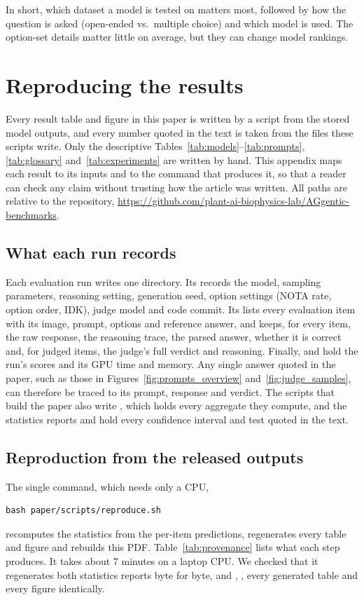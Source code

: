 \documentclass[10pt,letterpaper]{article}
\newcommand{\repo}{\url{https://github.com/plant-ai-biophysics-lab/AGgentic-benchmarks}}
\begin{document}
In short, which dataset a model is tested on matters most, followed by how the question is asked (open-ended vs.\ multiple choice) and which model is used. The option-set details matter little on average, but they can change model rankings.

\section{Reproducing the results}
\label{app:repro}
\setcounter{table}{0}
\renewcommand{\thetable}{D\arabic{table}}
\setcounter{figure}{0}
\renewcommand{\thefigure}{D\arabic{figure}}
Every result table and figure in this paper is written by a script from the stored model outputs, and every number quoted in the text is taken from the files these scripts write. Only the descriptive Tables~\ref{tab:models}--\ref{tab:prompts}, \ref{tab:glossary} and~\ref{tab:experiments} are written by hand. This appendix maps each result to its inputs and to the command that produces it, so that a reader can check any claim without trusting how the article was written. All paths are relative to the repository, \repo.

\subsection{What each run records}
Each evaluation run writes one directory. Its  records the model, sampling parameters, reasoning setting, generation seed, option settings (NOTA rate, option order, IDK), judge model and code commit. Its  lists every evaluation item with its image, prompt, options and reference answer, and  keeps, for every item, the raw response, the reasoning trace, the parsed answer, whether it is correct and, for judged items, the judge's full verdict and reasoning. Finally,  and  hold the run's scores and its GPU time and memory.
Any single answer quoted in the paper, such as those in Figures~\ref{fig:prompts_overview} and~\ref{fig:judge_samples}, can therefore be traced to its prompt, response and verdict. The scripts that build the paper also write , which holds every aggregate they compute, and the statistics reports  and  hold every confidence interval and test quoted in the text.

\subsection{Reproduction from the released outputs}
The single command, which needs only a CPU,
{\footnotesize
\begin{verbatim}
bash paper/scripts/reproduce.sh
\end{verbatim}
}
\noindent recomputes the statistics from the per-item predictions, regenerates every table and figure and rebuilds this PDF. Table~\ref{tab:provenance} lists what each step produces. It takes about 7 minutes on a laptop CPU. We checked that it regenerates both statistics reports byte for byte, and , , every generated table and every figure identically.
\end{document}
